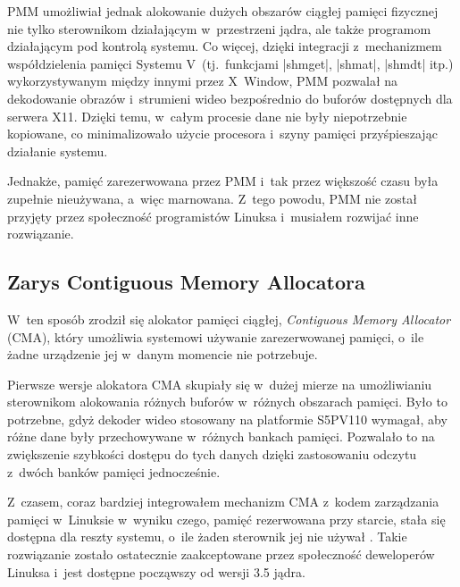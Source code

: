 PMM umożliwiał jednak alokowanie dużych obszarów ciągłej pamięci
fizycznej nie tylko sterownikom działającym w~przestrzeni jądra, ale
także programom działającym pod kontrolą systemu. Co więcej, dzięki
integracji z~mechanizmem współdzielenia pamięci Systemu
V~(tj.\ funkcjami \code|shmget|, \code|shmat|, \code|shmdt| itp.)
wykorzystywanym między innymi przez X~Window, PMM pozwalał na
dekodowanie obrazów i~strumieni wideo bezpośrednio do buforów
dostępnych dla serwera X11.  Dzięki temu, w~całym procesie dane nie
były niepotrzebnie kopiowane, co minimalizowało użycie procesora
i~szyny pamięci przyśpieszając działanie systemu.

Jednakże, pamięć zarezerwowana przez PMM i~tak przez większość czasu
była zupełnie nieużywana, a~więc marnowana.  Z~tego powodu, PMM nie
został przyjęty przez społeczność programistów Linuksa i~musiałem
rozwijać inne rozwiązanie.

\subsection{Zarys Contiguous Memory Allocatora}

W~ten sposób zrodził się alokator pamięci ciągłej, \textit{Contiguous
  Memory Allocator} (CMA), który umożliwia systemowi używanie
zarezerwowanej pamięci, o~ile żadne urządzenie jej w~danym momencie
nie potrzebuje.

Pierwsze wersje alokatora CMA skupiały się w~dużej mierze na
umożliwianiu sterownikom alokowania różnych buforów w~różnych
obszarach pamięci.  Było to potrzebne, gdyż dekoder wideo stosowany na
platformie S5PV110 wymagał, aby różne dane były przechowywane
w~różnych bankach pamięci.  Pozwalało to na zwiększenie szybkości
dostępu do tych danych dzięki zastosowaniu odczytu z~dwóch banków
pamięci jednocześnie.

Z~czasem, coraz bardziej integrowałem mechanizm CMA z~kodem
zarządzania pamięci w~Linuksie w~wyniku czego, pamięć rezerwowana przy
starcie, stała się dostępna dla reszty systemu, o~ile żaden sterownik
jej nie używał \autocite{patch:cma-24}.  Takie rozwiązanie zostało
ostatecznie zaakceptowane przez społeczność deweloperów Linuksa i~jest
dostępne począwszy od wersji 3.5 jądra.
